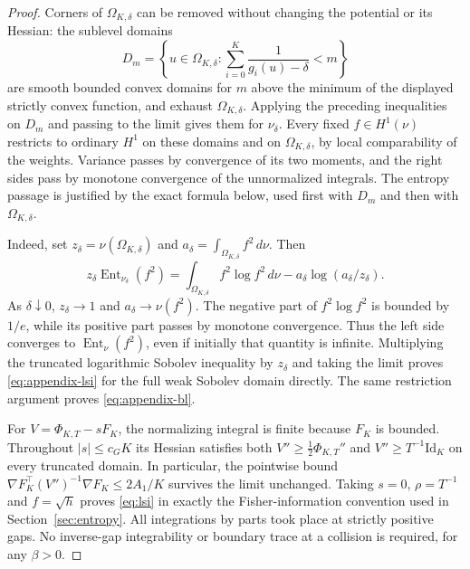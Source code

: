 \documentclass[11pt,reqno]{amsart}
\numberwithin{equation}{section}
\theoremstyle{definition}
\theoremstyle{remark}
\newcommand{\1}{\mathbf 1}
\newcommand{\Ent}{\operatorname{Ent}}
\newcommand{\Id}{\mathrm{Id}}
\newcommand{\dd}{\,d}
\begin{document}
\begin{proof}
Corners of $\Omega_{K,\delta}$ can be removed without changing
the potential or its Hessian: the sublevel domains
\[
D_m=\left\{u\in\Omega_{K,\delta}:
 \sum_{i=0}^K\frac1{g_i(u)-\delta}<m\right\}
\]
are smooth bounded convex domains for $m$ above the minimum of
the displayed strictly convex function, and exhaust
$\Omega_{K,\delta}$. Applying the preceding inequalities on
$D_m$ and passing to the limit gives them for $\nu_\delta$.
Every fixed $f\in H^1(\nu)$ restricts to ordinary $H^1$ on these
domains and on $\Omega_{K,\delta}$, by local comparability of the
weights. Variance passes by convergence of its two moments, and
the right sides pass by monotone convergence of the unnormalized
integrals. The entropy passage is justified by the exact formula
below, used first with $D_m$ and then with $\Omega_{K,\delta}$.

Indeed, set $z_\delta=\nu(\Omega_{K,\delta})$ and
$a_\delta=\int_{\Omega_{K,\delta}}f^2\dd\nu$. Then
\[
z_\delta\Ent_{\nu_\delta}(f^2)
=\int_{\Omega_{K,\delta}}f^2\log f^2\dd\nu
 -a_\delta\log(a_\delta/z_\delta).
\]
As $\delta\downarrow0$, $z_\delta\to1$ and
$a_\delta\to\nu(f^2)$. The negative part of $f^2\log f^2$ is
bounded by $1/e$, while its positive part passes by monotone
convergence. Thus the left side converges to
$\Ent_\nu(f^2)$, even if initially that quantity is infinite.
Multiplying the truncated logarithmic Sobolev inequality by
$z_\delta$ and taking the limit proves
\eqref{eq:appendix-lsi} for the full weak Sobolev domain directly.
The same restriction argument proves \eqref{eq:appendix-bl}.

For $V=\Phi_{K,T}-sF_K$, the normalizing integral is finite because
$F_K$ is bounded. Throughout $|s|\le c_GK$ its Hessian satisfies
both $V''\ge\frac12\Phi_{K,T}''$ and $V''\ge T^{-1}\Id_K$ on every
truncated domain. In particular, the pointwise bound
$\nabla F_K^\top(V'')^{-1}\nabla F_K\le2A_1/K$ survives the
limit unchanged. Taking $s=0$, $\rho=T^{-1}$ and $f=\sqrt h$
proves \eqref{eq:lsi} in exactly the Fisher-information convention
used in Section~\ref{sec:entropy}. All integrations by parts took
place at strictly positive gaps. No inverse-gap integrability or
boundary trace at a collision is required, for any $\beta>0$.
\end{proof}
\end{document}
